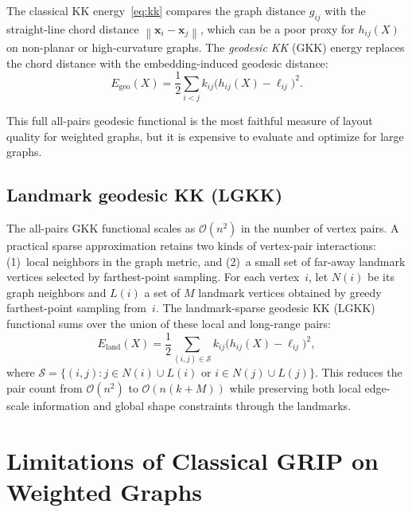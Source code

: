 \documentclass[11pt,twocolumn]{article}
\newcommand{\norm}[1]{\left\lVert #1 \right\rVert}
\newcommand{\vect}[1]{\mathbf{#1}}
\newcommand{\bigO}{\mathcal{O}}
\begin{document}
The classical KK energy~\eqref{eq:kk} compares the graph distance
$g_{ij}$ with the straight-line chord distance
$\norm{\vect{x}_i - \vect{x}_j}$, which can be a poor proxy for
$h_{ij}(X)$ on non-planar or high-curvature graphs.  The
\emph{geodesic KK} (GKK) energy replaces the chord distance with the
embedding-induced geodesic distance:
\begin{equation}\label{eq:gkk}
  E_{\mathrm{geo}}(X)
  = \frac{1}{2}\sum_{i < j}
    k_{ij}\bigl(h_{ij}(X) - \ell_{ij}\bigr)^2.
\end{equation}

This full all-pairs geodesic functional is the most faithful measure of
layout quality for weighted graphs, but it is expensive to evaluate and
optimize for large graphs.

\subsection{Landmark geodesic KK (LGKK)}

The all-pairs GKK functional scales as $\bigO(n^2)$ in the number of
vertex pairs.  A practical sparse approximation retains two kinds of
vertex-pair interactions: (1)~local neighbors in the graph metric, and
(2)~a small set of far-away landmark vertices selected by farthest-point
sampling.  For each vertex~$i$, let $N(i)$ be its graph neighbors and
$L(i)$ a set of $M$ landmark vertices obtained by greedy farthest-point
sampling from~$i$.  The landmark-sparse geodesic KK (LGKK) functional
sums over the union of these local and long-range pairs:
\begin{equation}\label{eq:lgkk}
  E_{\mathrm{land}}(X)
  = \frac{1}{2}\sum_{(i,j) \in \mathcal{S}}
    k_{ij}\bigl(h_{ij}(X) - \ell_{ij}\bigr)^2,
\end{equation}
where $\mathcal{S} = \{(i,j) : j \in N(i) \cup L(i) \text{ or } i \in
N(j) \cup L(j)\}$.  This reduces the pair count from $\bigO(n^2)$ to
$\bigO(n(k + M))$ while preserving both local edge-scale information and
global shape constraints through the landmarks.


\section{Limitations of Classical GRIP on Weighted Graphs}\label{sec:limitations}
\end{document}
